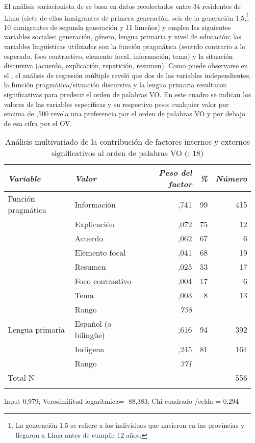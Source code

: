 \documentclass[output=paper]{langscibook}
\begin{document}
El análisis variacionista de \citet{KleeTightCaravedo2011} se basa en datos recolectados entre 34 residentes de Lima (siete de ellos inmigrantes de primera generación, seis de la generación 1,5,\footnote{La generación 1,5 se refiere a los individuos que nacieron en las provincias y llegaron a Lima antes de cumplir 12 años.} 10 inmigrantes de segunda generación y 11 limeños) y emplea las siguientes variables sociales: generación, género, lengua primaria y nivel de educación; las variables lingüísticas utilizadas son la función pragmática (sentido contrario a lo esperado, foco contrastivo, elemento focal, información, tema) y la situación discursiva (acuerdo, explicación, repetición, resumen). Como puede observarse en el , el análisis de regresión múltiple reveló que dos de las variables independientes, la función pragmática/situación discursiva y la lengua primaria resultaron significativas para predecir el orden de palabras VO. En este cuadro se indican los valores de las variables específicas y su respectivo peso; cualquier valor por encima de ,500 revela una preferencia por el orden de palabras VO y por debajo de esa cifra por el OV.

\begin{table}
\caption{\label{tab:klee:2} Análisis multivariado de la contribución de factores internos y externos significativos al orden de palabras VO (\citealt{KleeTightCaravedo2011}: 18)}
\begin{tabularx}{\textwidth}{QQrrr}
\lsptoprule

{\textit{Variable}} & {\textit{Valor}} & {\textit{Peso del} } {\textit{factor}} & {\textit{\%}} & {\textit{Número}}\\
\midrule
{Función pragmática} & {Información} & {,741} & {99} & {415}\\
& {Explicación} & {,072} & {75} & {  12}\\
& {Acuerdo} & {,062} & { 67} & {    6}\\
& {Elemento focal}  & {,041} & {68} & {  19}\\
& {Resumen} & {,025} & {53} & {  17}\\
& {Foco contrastivo} & {,004} & {17} & {    6}\\
& {Tema} & {,003} & {   8} & {   13}\\
& {Rango} & {\textit{738}} &  & \\
\tablevspace
{Lengua primaria} & {Español (o bilingüe)} & {,616} & {94} & {392}\\
& {Indígena} & {,245} & {81} & {164}\\
& {Rango} & {\textit{371}} &  & \\
\midrule
{Total N} & & & & {556}\\
\lspbottomrule
\end{tabularx}
Input 0,979; Verosimilitud logarítmica= -88,383; Chi cuadrado /celda = 0,294
\end{table}
\end{document}
